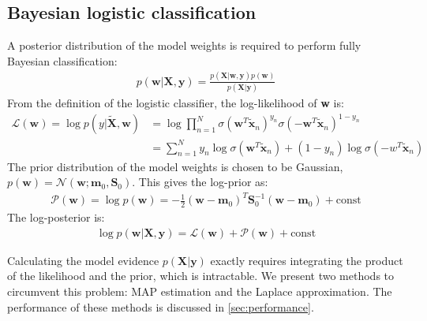\documentclass[a4paper]{article}
\begin{document}
    \subsection{Bayesian logistic classification}
    A posterior distribution of the model weights is required to perform fully Bayesian classification:
    \begin{align}
        p(\bm{w} | \bm{X}, \bm{y}) = \frac{p(\bm{X} | \bm{w}, \bm{y}) p(\bm w)}{p(\bm{X} | \bm{y})}
        \label{eq:posterior}
    \end{align}
    From the definition of the logistic classifier, the log-likelihood of \textbf{w} is:
    \begin{align}
        \mathcal{L}(\bm{w}) = \log p(y|\tilde{\bm{X}}, \bm{w})
        &= \log \prod_{n=1}^{N} \sigma( \bm{w}^T \tilde{\bm{x}}_n)^{y_n}
        \sigma (-\bm{w}^T \tilde{\bm{x}}_n)^{1-y_n} \nonumber \\
        &= \sum_{n=1}^{N} y_n \log\sigma( \bm{w}^T \tilde{\bm{x}}_n) + (1-y_n) \log\sigma(-w^T \tilde{\bm{x}}_n)
        \label{eq:log-likelihood}
    \end{align}
    The prior distribution of the model weights is chosen to be Gaussian, $p(\bm{w}) = \mathcal{N}(\bm{w}; \bm{m}_0, \bm{S}_0)$.
    This gives the log-prior as:
    \begin{align}
        \mathcal{P}(\bm{w}) = \log p(\bm{w}) = -\frac{1}{2}(\bm{w} - \bm{m}_0)^T \bm{S}_0^{-1} (\bm{w} - \bm{m}_0) + \text{const}
        \label{eq:log-prior}
    \end{align}
    The log-posterior is:
    \begin{align}
        \log p(\bm{w} | \bm{X}, \bm{y}) = \mathcal{L}(\bm{w}) + \mathcal{P}(\bm{w}) + \text{const}
        \label{eq:log-posterior}
    \end{align}

    Calculating the model evidence $p(\bm{X} | \bm{y})$ exactly requires integrating the product of the likelihood and the prior, which is intractable.
    We present two methods to circumvent this problem: MAP estimation and the Laplace approximation. The performance of these methods is discussed in \autoref{sec:performance}.
\end{document}
